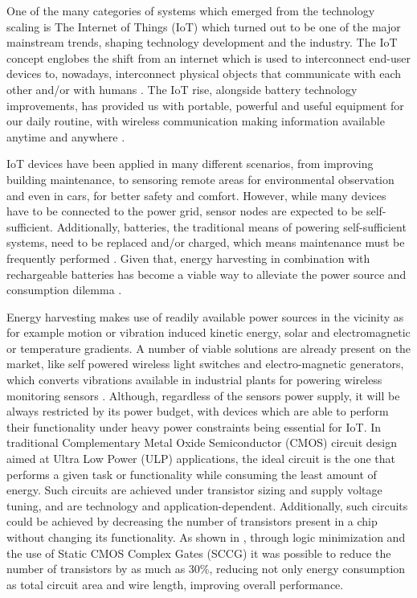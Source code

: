 \documentclass[diss,pgmicro,english]{iiufrgs}
\begin{document}
    One of the many categories of systems which emerged from the technology scaling is The Internet of Things (IoT) which turned out to be one of the major mainstream trends, shaping technology development and the industry. The IoT concept englobes the shift from an internet which is used to interconnect end-user devices to, nowadays, interconnect physical objects that communicate with each other and/or with humans \cite{miorandi2012internet}. The IoT rise, alongside battery technology improvements, has provided us with portable, powerful and useful equipment for our daily routine, with wireless communication making information available anytime and anywhere \cite{manoli2010energy}.

    IoT devices have been applied in many different scenarios, from improving building maintenance, to sensoring remote areas for environmental observation and even in cars, for better safety and comfort. However, while many devices have to be connected to the power grid, sensor nodes are expected to be self-sufficient. Additionally, batteries, the traditional means of powering self-sufficient systems, need to be replaced and/or charged, which means maintenance must be frequently performed \cite{bleitner2018comparison}. Given that, energy harvesting in combination with rechargeable batteries has become a viable way to alleviate the power source and consumption dilemma \cite{manoli2010energy}.

    Energy harvesting makes use of readily available power sources in the vicinity as for example motion or vibration induced kinetic energy, solar and electromagnetic or temperature gradients. A number of viable solutions are already present on the market, like self powered wireless light switches and electro-magnetic generators, which converts vibrations available in industrial plants for powering wireless monitoring sensors \cite{manoli2010energy} \cite{bleitner2018comparison}. Although, regardless of the sensors power supply, it will be always restricted by its power budget, with devices which are able to perform their functionality under heavy power constraints being essential for IoT. In traditional Complementary Metal Oxide Semiconductor (CMOS) circuit design aimed at Ultra Low Power (ULP) applications, the ideal circuit is the one that performs a given task or functionality while consuming the least amount of energy. Such circuits are achieved under transistor sizing and supply voltage tuning, and are technology and application-dependent. Additionally, such circuits could be achieved by decreasing the number of transistors present in a chip without changing its functionality. As shown in \cite{reis1995associating}, through logic minimization and the use of Static CMOS Complex Gates (SCCG) it was possible to reduce the number of transistors by as much as 30\%, reducing not only energy consumption as total circuit area and wire length, improving overall performance.
\end{document}

